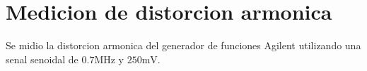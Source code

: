 \chapter{Medicion de distorcion armonica}
Se midio la distorcion armonica del generador de funciones Agilent
utilizando una senal senoidal de $0.7\si{\mega\hertz}$ y $250\si{\milli\volt}$.

